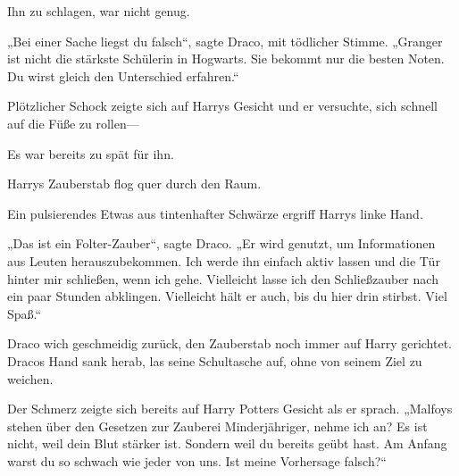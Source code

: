 Ihn zu schlagen, war nicht genug.

„Bei einer Sache liegst du falsch“, sagte Draco, mit tödlicher Stimme. „Granger ist nicht die stärkste Schülerin in Hogwarts. Sie bekommt nur die besten Noten. Du wirst gleich den Unterschied erfahren.“

Plötzlicher Schock zeigte sich auf Harrys Gesicht und er versuchte, sich schnell auf die Füße zu rollen—

Es war bereits zu spät für ihn.


Harrys Zauberstab flog quer durch den Raum.


Ein pulsierendes Etwas aus tintenhafter Schwärze ergriff Harrys linke Hand.

„Das ist ein Folter-Zauber“, sagte Draco. „Er wird genutzt, um Informationen aus Leuten herauszubekommen. Ich werde ihn einfach aktiv lassen und die Tür hinter mir schließen, wenn ich gehe. Vielleicht lasse ich den Schließzauber nach ein paar Stunden abklingen. Vielleicht hält er auch, bis du hier drin stirbst. Viel Spaß.“

Draco wich geschmeidig zurück, den Zauberstab noch immer auf Harry gerichtet. Dracos Hand sank herab, las seine Schultasche auf, ohne von seinem Ziel zu weichen.

Der Schmerz zeigte sich bereits auf Harry Potters Gesicht als er sprach. „Malfoys stehen über den Gesetzen zur Zauberei Minderjähriger, nehme ich an? Es ist nicht, weil dein Blut stärker ist. Sondern weil du bereits geübt hast. Am Anfang warst du so schwach wie jeder von uns. Ist meine Vorhersage falsch?“

